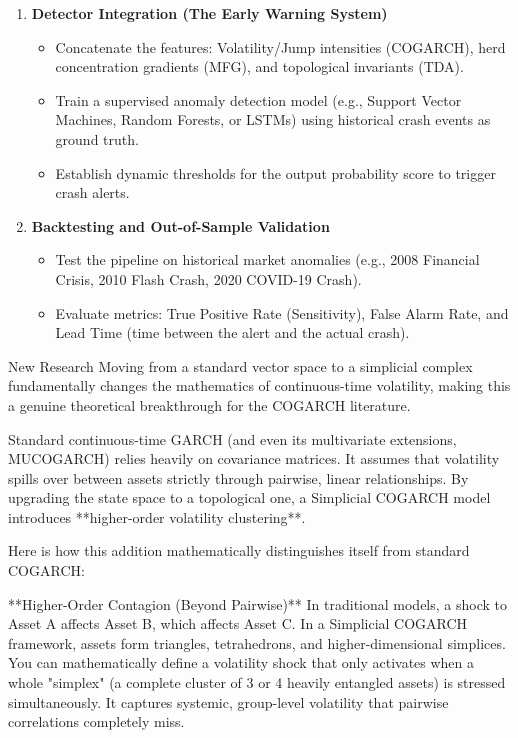 \documentclass[11pt, a4paper]{article}
\begin{document}
\begin{enumerate}[label=\textbf{Phase \arabic*:}, leftmargin=*]
    \item \textbf{Detector Integration (The Early Warning System)}
    \begin{itemize}
        \item Concatenate the features: Volatility/Jump intensities (COGARCH), herd concentration gradients (MFG), and topological invariants (TDA).
        \item Train a supervised anomaly detection model (e.g., Support Vector Machines, Random Forests, or LSTMs) using historical crash events as ground truth.
        \item Establish dynamic thresholds for the output probability score to trigger crash alerts.
    \end{itemize}

    \item \textbf{Backtesting and Out-of-Sample Validation}
    \begin{itemize}
        \item Test the pipeline on historical market anomalies (e.g., 2008 Financial Crisis, 2010 Flash Crash, 2020 COVID-19 Crash).
        \item Evaluate metrics: True Positive Rate (Sensitivity), False Alarm Rate, and Lead Time (time between the alert and the actual crash).
    \end{itemize}
\end{enumerate}

New Research
Moving from a standard vector space to a simplicial complex fundamentally changes the mathematics of continuous-time volatility, making this a genuine theoretical breakthrough for the COGARCH literature.

Standard continuous-time GARCH (and even its multivariate extensions, MUCOGARCH) relies heavily on covariance matrices. It assumes that volatility spills over between assets strictly through pairwise, linear relationships. By upgrading the state space to a topological one, a Simplicial COGARCH model introduces **higher-order volatility clustering**.

Here is how this addition mathematically distinguishes itself from standard COGARCH:

**Higher-Order Contagion (Beyond Pairwise)**
In traditional models, a shock to Asset A affects Asset B, which affects Asset C. In a Simplicial COGARCH framework, assets form triangles, tetrahedrons, and higher-dimensional simplices. You can mathematically define a volatility shock that only activates when a whole "simplex" (a complete cluster of 3 or 4 heavily entangled assets) is stressed simultaneously. It captures systemic, group-level volatility that pairwise correlations completely miss.
\end{document}
